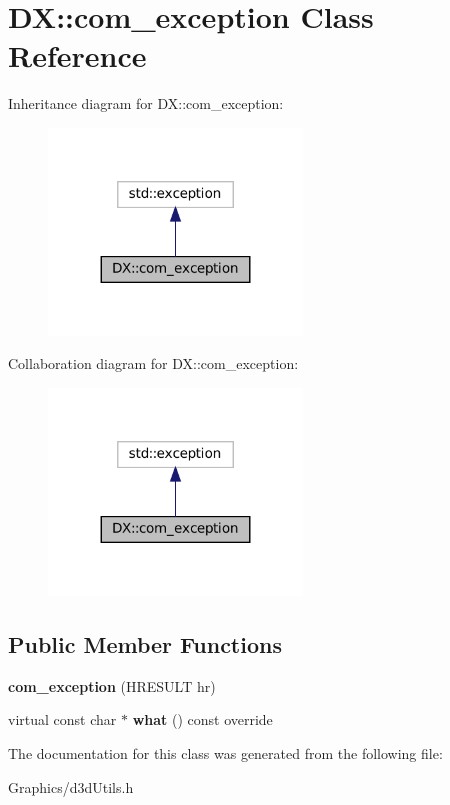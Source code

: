 \hypertarget{classDX_1_1com__exception}{}\section{DX\+:\+:com\+\_\+exception Class Reference}
\label{classDX_1_1com__exception}


Inheritance diagram for DX\+:\+:com\+\_\+exception\+:
\nopagebreak
\begin{figure}[H]
\begin{center}
\leavevmode
\includegraphics[width=191pt]{classDX_1_1com__exception__inherit__graph}
\end{center}
\end{figure}


Collaboration diagram for DX\+:\+:com\+\_\+exception\+:
\nopagebreak
\begin{figure}[H]
\begin{center}
\leavevmode
\includegraphics[width=191pt]{classDX_1_1com__exception__coll__graph}
\end{center}
\end{figure}
\subsection*{Public Member Functions}
\begin{DoxyCompactItemize}
\item 
\mbox{\label{classDX_1_1com__exception_aa1867f0d21fb5d5cdac40d79cfa07ffb}} 
{\bfseries com\+\_\+exception} (H\+R\+E\+S\+U\+LT hr)
\item 
\mbox{\label{classDX_1_1com__exception_aec8c85514b6908b1ddc794d7ed18e9e5}} 
virtual const char $\ast$ {\bfseries what} () const override
\end{DoxyCompactItemize}


The documentation for this class was generated from the following file\+:\begin{DoxyCompactItemize}
\item 
Graphics/d3d\+Utils.\+h\end{DoxyCompactItemize}
